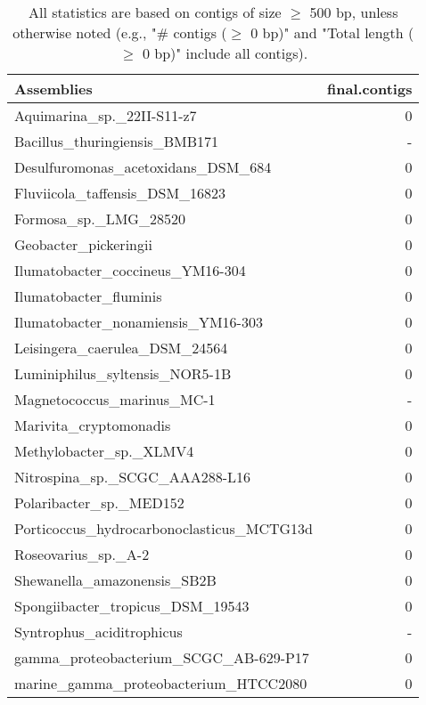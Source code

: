 \documentclass[12pt,a4paper]{article}
\begin{document}
\begin{table}[ht]
\begin{center}
\caption{All statistics are based on contigs of size $\geq$ 500 bp, unless otherwise noted (e.g., "\# contigs ($\geq$ 0 bp)" and "Total length ($\geq$ 0 bp)" include all contigs).}
\begin{tabular}{|l*{1}{|r}|}
\hline
Assemblies & final.contigs \\ \hline
Aquimarina\_sp.\_22II-S11-z7 & 0 \\ \hline
Bacillus\_thuringiensis\_BMB171 & - \\ \hline
Desulfuromonas\_acetoxidans\_DSM\_684 & 0 \\ \hline
Fluviicola\_taffensis\_DSM\_16823 & 0 \\ \hline
Formosa\_sp.\_LMG\_28520 & 0 \\ \hline
Geobacter\_pickeringii & 0 \\ \hline
Ilumatobacter\_coccineus\_YM16-304 & 0 \\ \hline
Ilumatobacter\_fluminis & 0 \\ \hline
Ilumatobacter\_nonamiensis\_YM16-303 & 0 \\ \hline
Leisingera\_caerulea\_DSM\_24564 & 0 \\ \hline
Luminiphilus\_syltensis\_NOR5-1B & 0 \\ \hline
Magnetococcus\_marinus\_MC-1 & - \\ \hline
Marivita\_cryptomonadis & 0 \\ \hline
Methylobacter\_sp.\_XLMV4 & 0 \\ \hline
Nitrospina\_sp.\_SCGC\_AAA288-L16 & 0 \\ \hline
Polaribacter\_sp.\_MED152 & 0 \\ \hline
Porticoccus\_hydrocarbonoclasticus\_MCTG13d & 0 \\ \hline
Roseovarius\_sp.\_A-2 & 0 \\ \hline
Shewanella\_amazonensis\_SB2B & 0 \\ \hline
Spongiibacter\_tropicus\_DSM\_19543 & 0 \\ \hline
Syntrophus\_aciditrophicus & - \\ \hline
gamma\_proteobacterium\_SCGC\_AB-629-P17 & 0 \\ \hline
marine\_gamma\_proteobacterium\_HTCC2080 & 0 \\ \hline
\end{tabular}
\end{center}
\end{table}
\end{document}
